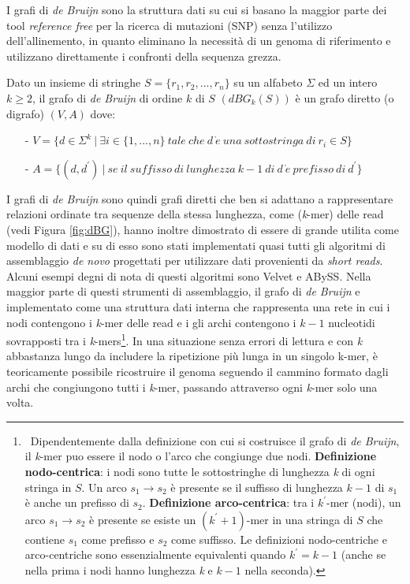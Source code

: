 \documentclass[../main.tex]{subfiles}
\begin{document}
I grafi di \textit{de Bruijn} sono la struttura dati su cui si basano la maggior parte dei tool \textit{reference free} per la  ricerca di mutazioni (SNP) senza l'utilizzo dell'allinemento, in quanto eliminano la necessità di un genoma di riferimento e utilizzano direttamente i confronti della sequenza grezza.

\theoremstyle{definition}
\begin{definition} 
Dato un insieme di stringhe $S = \{r_1 , r_2 , ... , r_n\}$ su un alfabeto $\Sigma$ ed un intero $k\geq2$, il grafo di \textit{de Bruijn} di ordine $k$ di $S$ $(dBG_k (S))$ è un grafo diretto (o digrafo) $(V,A)$ dove:
\begin{itemize}
\item[-] $V = \{d \in \Sigma^k \ |\  \exists i \in \{1, ..., n\} \ tale\ che\ d\ \grave{e}\ una\ sottostringa\ di\ r_i \in S\}$
\item[-]$A = \{ (d,d^\prime)\ |\ se\ il\ suffisso\ di\ lunghezza\ k-1\ di\ d\ \grave{e}\ prefisso\ di\ d^\prime\}$
\end{itemize}
\end{definition}

\noindent
I grafi di \textit{de Bruijn} sono quindi grafi diretti che ben si adattano a rappresentare relazioni ordinate tra sequenze della stessa lunghezza, come (\textit{k}-mer) delle read (vedi Figura \ref{fig:dBG}), hanno inoltre dimostrato di essere di grande utilita come modello di dati e su di esso sono stati implementati quasi tutti gli algoritmi di assemblaggio \textit{de novo} progettati per utilizzare dati provenienti da \textit{short reads}. Alcuni esempi degni di nota di questi algoritmi sono Velvet e ABySS. Nella maggior parte di questi strumenti di assemblaggio, il grafo di \textit{de Bruijn} e implementato come una struttura dati interna che rappresenta una rete in cui i nodi contengono i \textit{k}-mer delle read e i gli archi contengono i $k-1$ nucleotidi sovrapposti tra i \textit{k}-mers\footnote{\ Dipendentemente dalla definizione con cui si costruisce il grafo di \textit{de Bruijn}, il \textit{k}-mer puo essere il nodo o l'arco che congiunge due nodi. \textbf{Definizione nodo-centrica}: i nodi sono tutte le sottostringhe di lunghezza \textit{k} di ogni stringa in $S$. Un arco $s_1 \rightarrow s_2$ è presente se il suffisso di lunghezza $k-1$ di $s_1$ è anche un prefisso di $s_2$. \textbf{Definizione arco-centrica}: tra i $k^\prime$-mer (nodi), un arco $s_1 \rightarrow s_2$ è presente se esiste un $(k^\prime+1)$-mer in una stringa di $S$ che contiene $s_1$ come prefisso e $s_2$ come suffisso. Le definizioni nodo-centriche e arco-centriche sono essenzialmente equivalenti quando $k^\prime = k-1$ (anche se nella prima i nodi hanno lunghezza \textit{k} e $k - 1$ nella seconda).}. In una situazione senza errori di lettura e con \textit{k} abbastanza lungo da includere la ripetizione più lunga in un singolo k-mer, è teoricamente possibile ricostruire il genoma seguendo il cammino formato dagli archi che congiungono tutti i \textit{k}-mer, passando attraverso ogni \textit{k}-mer solo una volta. 
\end{document}
